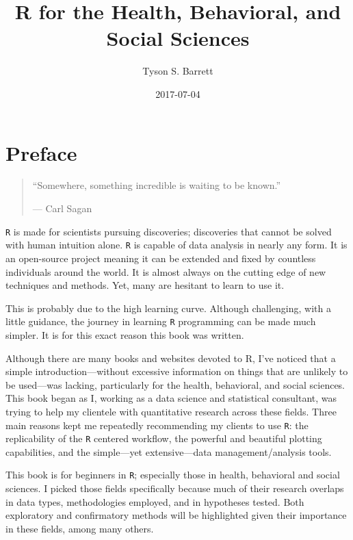 \documentclass[]{tufte-book}
\title{R for the Health, Behavioral, and Social Sciences}
\author{Tyson S. Barrett}
\date{2017-07-04}
\theoremstyle{definition}
\theoremstyle{definition}
\theoremstyle{remark}
\begin{document}
\maketitle



{
\setcounter{tocdepth}{1}
\tableofcontents
}

\chapter*{Preface}\label{preface}

\begin{quote}
``Somewhere, something incredible is waiting to be known.''

--- Carl Sagan
\end{quote}

\texttt{R} is made for scientists pursuing discoveries; discoveries that
cannot be solved with human intuition alone. \texttt{R} is capable of
data analysis in nearly any form. It is an open-source project meaning
it can be extended and fixed by countless individuals around the world.
It is almost always on the cutting edge of new techniques and methods.
Yet, many are hesitant to learn to use it.

This is probably due to the high learning curve. Although challenging,
with a little guidance, the journey in learning \texttt{R} programming
can be made much simpler. It is for this exact reason this book was
written.

Although there are many books and websites devoted to R, I've noticed
that a simple introduction---without excessive information on things
that are unlikely to be used---was lacking, particularly for the health,
behavioral, and social sciences. This book began as I, working as a data
science and statistical consultant, was trying to help my clientele with
quantitative research across these fields. Three main reasons kept me
repeatedly recommending my clients to use \texttt{R}: the replicability
of the \texttt{R} centered workflow, the powerful and beautiful plotting
capabilities, and the simple---yet extensive---data management/analysis
tools.

This book is for beginners in \texttt{R}; especially those in health,
behavioral and social sciences. I picked those fields specifically
because much of their research overlaps in data types, methodologies
employed, and in hypotheses tested. Both exploratory and confirmatory
methods will be highlighted given their importance in these fields,
among many others.
\end{document}
